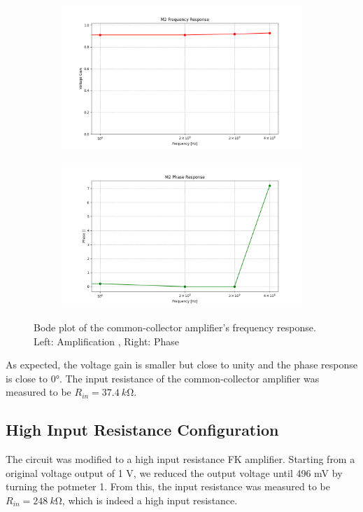 \documentclass[12pt,a4paper]{article}
\begin{document}
\begin{figure}[H]
    \centering
    \begin{subfigure}[b]{0.48\linewidth}
        \centering
        \includegraphics[width=\linewidth]{m2_frequency_response_A.png}
    \end{subfigure}\hfill
    \begin{subfigure}[b]{0.48\linewidth}
        \centering
        \includegraphics[width=\linewidth]{m2_phase_response.png}
    \end{subfigure}
    \caption{Bode plot of the common-collector amplifier's frequency response. Left: Amplification , Right: Phase}
    \label{fig:bode_plot_m2}
\end{figure}

As expected, the voltage gain is smaller but close to unity and the phase response is close to 0°. The input resistance of the common-collector amplifier was measured to be $R_{in} = \SI{37.4}{k\ohm}$.

\subsection{High Input Resistance Configuration}
The circuit was modified to a high input resistance FK amplifier. Starting from a original voltage output of 1 V, we reduced the output voltage until 496 mV by turning the potmeter 1. From this, the input resistance was measured to be $R_{in} = \SI{248}{k\ohm}$, which is indeed a high input resistance.
\end{document}
